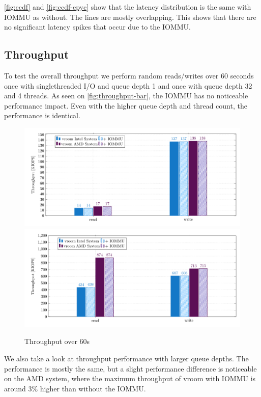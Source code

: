 \autoref{fig:ccdf} and \autoref{fig:ccdf-epyc} show that the latency distribution is the same with IOMMU as without. The lines are mostly overlapping. This shows that there are no significant latency spikes that occur due to the IOMMU.

\subsection{Throughput}
To test the overall throughput we perform random reads/writes over 60 seconds once with singlethreaded I/O and queue depth 1 and once with queue depth 32 and 4 threads. As seen on \autoref{fig:throughput-bar}, the IOMMU has no noticeable performance impact. Even with the higher queue depth and thread count, the performance is identical.

\begin{figure}[H]
  \centering
   {\includegraphics[width=.9\textwidth]{figures/throughput_bar_qd1t1} \label{fig:throughput-qd1t1}}
   {\includegraphics[width=.9\textwidth]{figures/throughput_bar_qd32t4} \label{fig:throughput-qd32t4}}
  \caption{Throughput over 60s}
  \label{fig:throughput-bar}
\end{figure}

We also take a look at throughput performance with larger queue depths. The performance is mostly the same, but a slight performance difference is noticeable on the AMD system, where the maximum throughput of vroom with IOMMU is around 3\% higher than without the IOMMU.

